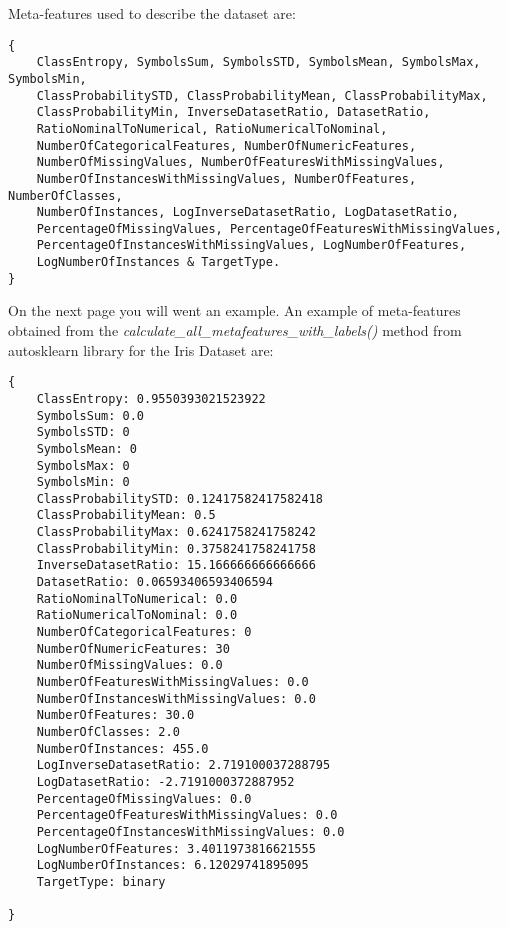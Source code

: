 Meta-features used to describe the dataset are:
\begin{lstlisting}
{
    ClassEntropy, SymbolsSum, SymbolsSTD, SymbolsMean, SymbolsMax, SymbolsMin,
    ClassProbabilitySTD, ClassProbabilityMean, ClassProbabilityMax,
    ClassProbabilityMin, InverseDatasetRatio, DatasetRatio,
    RatioNominalToNumerical, RatioNumericalToNominal,
    NumberOfCategoricalFeatures, NumberOfNumericFeatures,
    NumberOfMissingValues, NumberOfFeaturesWithMissingValues,
    NumberOfInstancesWithMissingValues, NumberOfFeatures, NumberOfClasses,
    NumberOfInstances, LogInverseDatasetRatio, LogDatasetRatio,
    PercentageOfMissingValues, PercentageOfFeaturesWithMissingValues,
    PercentageOfInstancesWithMissingValues, LogNumberOfFeatures,
    LogNumberOfInstances & TargetType.
}
\end{lstlisting}
On the next page you will went an example.
\newpage
An example of meta-features obtained from the \textit{calculate\_all\_metafeatures\_with\_labels()} method from autosklearn library for the Iris Dataset are:

\begin{lstlisting}
{
	ClassEntropy: 0.9550393021523922
    SymbolsSum: 0.0
    SymbolsSTD: 0
    SymbolsMean: 0
    SymbolsMax: 0
    SymbolsMin: 0
    ClassProbabilitySTD: 0.12417582417582418
    ClassProbabilityMean: 0.5
    ClassProbabilityMax: 0.6241758241758242
    ClassProbabilityMin: 0.3758241758241758
    InverseDatasetRatio: 15.166666666666666
    DatasetRatio: 0.06593406593406594
    RatioNominalToNumerical: 0.0
    RatioNumericalToNominal: 0.0
    NumberOfCategoricalFeatures: 0
    NumberOfNumericFeatures: 30
    NumberOfMissingValues: 0.0
    NumberOfFeaturesWithMissingValues: 0.0
    NumberOfInstancesWithMissingValues: 0.0
    NumberOfFeatures: 30.0
    NumberOfClasses: 2.0
    NumberOfInstances: 455.0
    LogInverseDatasetRatio: 2.719100037288795
    LogDatasetRatio: -2.7191000372887952
    PercentageOfMissingValues: 0.0
    PercentageOfFeaturesWithMissingValues: 0.0
    PercentageOfInstancesWithMissingValues: 0.0
    LogNumberOfFeatures: 3.4011973816621555
    LogNumberOfInstances: 6.12029741895095
    TargetType: binary

}
\end{lstlisting}

